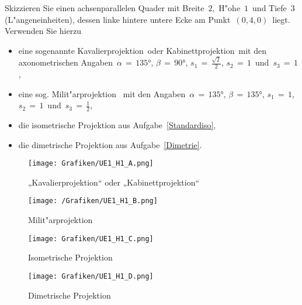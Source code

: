 \small
\begin{Aufgabe}
Skizzieren Sie einen achsenparallelen Quader mit Breite \,$2$,\, H"ohe \,$1$\, und Tiefe \,$3$\, (L"angeneinheiten), dessen linke hintere untere Ecke am Punkt \,$(0,4,0)$\, liegt. Verwenden Sie hierzu
    \begin{itemize}
    \item eine sogenannte \glqq Kavalierprojektion\grqq\ oder \glqq Kabinettprojektion\grqq\ mit den axonometrischen Angaben \,$\alpha \,=\, \ang{135}$,\; $\beta \,= \,\ang{90}$,\; $s_1 \,=\, \tfrac{\sqrt{2}}{2}$,\; $s_2 \,=\, 1$\, und\, $s_3\,=\, 1$,
     \item eine sog. \glqq Milit"arprojektion \grqq\ mit den Angaben \,$\alpha\,= \,\ang{135}$, \;$\beta\,=\, \ang{135}$,\; $s_1 \,= \,1$,\, $s_2 \,=\, 1$\, und\, $s_3 \,=\, \tfrac{1}{2}$,
     \item die isometrische Projektion aus Aufgabe~\ref{Standardiso},
     \item die dimetrische Projektion aus Aufgabe~\ref{Dimetrie}.
\end{itemize}
\end{Aufgabe}
\begin{Loesung}

\begin{figure}[H]
	\centering
	\texttt{[image: Grafiken/UE1\_H1\_A.png]}
	\caption{ „Kavalierprojektion“ oder „Kabinettprojektion“}
	\label{fig:H1_A}
\end{figure}

\begin{figure}[H]
	\centering
	\texttt{[image: /Grafiken/UE1\_H1\_B.png]}
	\caption{ Milit"arprojektion}
	\label{fig:H1_B}
\end{figure}

\begin{figure}[H]
	\centering
	\texttt{[image: Grafiken/UE1\_H1\_C.png]}
	\caption{ Isometrische Projektion}
	\label{fig:H1_C}
\end{figure}

\begin{figure}[H]
	\centering
	\texttt{[image: Grafiken/UE1\_H1\_D.png]}
	\caption{ Dimetrische Projektion}
	\label{fig:H1_D}
\end{figure}
\end{Loesung}
